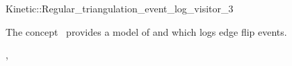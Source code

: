 

\begin{ccRefClass}{Kinetic::Regular_triangulation_event_log_visitor_3}


\ccDefinition
  
The concept \ccRefName\ provides a model of
 and  which logs edge flip events.


\ccIsModel

, 

\ccSeeAlso



\end{ccRefClass}


